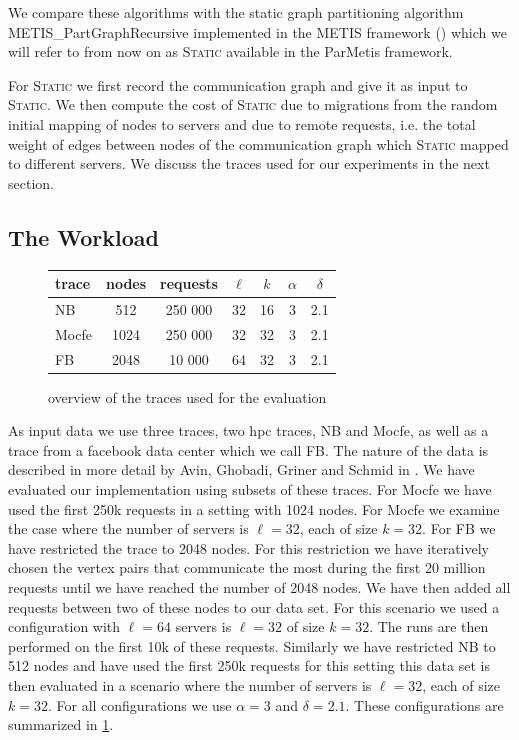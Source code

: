 \documentclass[a4paper,UKenglish,cleveref, autoref, thm-restate,authorcolumns]{lipics-v2019}
\newcommand{\static}{\textsc{Static}}
\newcommand{\fb}{FB}
\newcommand{\dbmocfe}{Mocfe}
\newcommand{\dbnekbone}{NB}
\begin{document}
We compare these algorithms with the static graph partitioning algorithm METIS\_PartGraphRecursive implemented in the METIS framework (\cite{Karypis1998, Karypis1998a}) which we will refer to from now on as \static{} available in the ParMetis framework. %

For \static{} we first record the communication graph and give it as input to \static{}. We then compute the cost of \static{} due to migrations from the random initial mapping of nodes to servers and due to remote requests, i.e. the total weight of edges between nodes of the communication graph which \static{} mapped to different servers.
We discuss the traces used for our experiments in the next section.

\subsection{The Workload}
\label{inputDesc}

\begin{figure}
	\begin{center}
		\begin{tabular}{|l|c|c|c|c|c|c|}
			\hline
			trace & nodes & requests & $\ell$ & $k$ & $\alpha$ & $\delta$\\
			\hline
			\dbnekbone{} & 512 & 250 000 & 32 & 16 & 3 & 2.1 \\
			\dbmocfe{} & 1024 & 250 000 & 32 & 32 & 3 & 2.1 \\
			\fb{} & 2048 & 10 000 & 64 & 32 & 3 & 2.1 \\
			\hline
		\end{tabular}
	\end{center}
	\caption{overview of the traces used for the evaluation}
	\label{fig:trace_overview}
\end{figure}

As input data we use three traces, two hpc traces, \dbnekbone{} and \dbmocfe{}, as well as a trace from a facebook data center which we call \fb{}.
 The nature of the data is described in more detail by Avin, Ghobadi, Griner and Schmid in \cite{Avin2019}.
We have evaluated our implementation using subsets of these traces. For \dbmocfe{} we have used the first 250k requests in a setting with 1024 nodes. 
For \dbmocfe{} we examine the case where the number of servers is $\ell=32$, each of size $k=32$.
For \fb{} we have restricted the trace to 2048 nodes. For this restriction we have iteratively chosen the vertex pairs that communicate the most during the first 20 million requests 
until we have reached the number of 2048 nodes. We have then added all requests between two of these nodes to our data set. For this scenario we used a configuration with $\ell=64$ 
servers is $\ell=32$ of size $k=32$.
The runs are then performed on the first 10k of these requests. Similarly we have restricted \dbnekbone{} to 512 nodes and have used the first 250k requests for this setting 
this data set is then evaluated in a scenario where the number of servers is $\ell=32$, each of size $k=32$.
For all configurations we use $\alpha=3$ and $\delta=2.1$.
These configurations are summarized in \cref{fig:trace_overview}.
\end{document}
